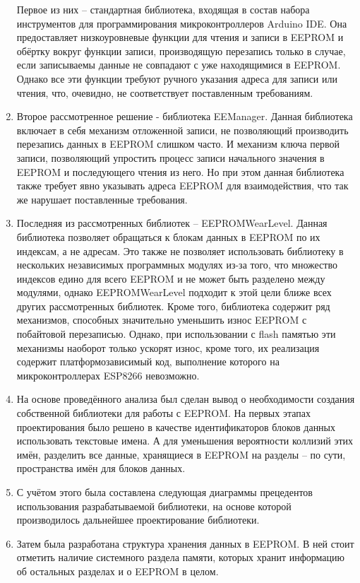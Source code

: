 \documentclass[14pt]{extarticle}
\begin{document}
\begin{enumerate}
	Первое из них -- стандартная библиотека, входящая в состав набора инструментов для программирования микроконтроллеров Arduino IDE.
	Она предоставляет низкоуровневые функции для чтения и записи в EEPROM и обёртку вокруг функции записи, производящую перезапись только в случае, если записываемы данные не совпадают с уже находящимися в EEPROM.
	Однако все эти функции требуют ручного указания адреса для записи или чтения, что, очевидно, не соответствует поставленным требованиям.
	\item Второе рассмотренное решение - библиотека EEManager.
	Данная библиотека включает в себя механизм отложенной записи, не позволяющий производить перезапись данных в EEPROM слишком часто.
	И механизм ключа первой записи, позволяющий упростить процесс записи начального значения в EEPROM и последующего чтения из него.
	Но при этом данная библиотека также требует явно указывать адреса EEPROM для взаимодействия, что так же нарушает поставленные требования.
	\item Последняя из рассмотренных библиотек -- EEPROMWearLevel.
	Данная библиотека позволяет обращаться к блокам данных в EEPROM по их индексам, а не адресам.
	Это также не позволяет использовать библиотеку в нескольких независимых программных модулях из-за того, что множество индексов едино для всего EEPROM и не может быть разделено между модулями, однако EEPROMWearLevel подходит к этой цели ближе всех других рассмотренных библиотек.
	Кроме того, библиотека содержит ряд механизмов, способных значительно уменьшить износ EEPROM с побайтовой перезаписью.
	Однако, при использовании с flash памятью эти механизмы наоборот только ускорят износ, кроме того, их реализация содержит платформозависимый код, выполнение которого на микроконтроллерах ESP8266 невозможно.
	\item На основе проведённого анализа был сделан вывод о необходимости создания собственной библиотеки для работы с EEPROM. На первых этапах проектирования было решено в качестве идентификаторов блоков данных использовать текстовые имена.
	А для уменьшения вероятности коллизий этих имён, разделить все данные, хранящиеся в EEPROM на разделы -- по сути, пространства имён для блоков данных.
	\item С учётом этого была составлена следующая диаграммы прецедентов использования разрабатываемой библиотеки, на основе которой производилось дальнейшее проектирование библиотеки.
	\item Затем была разработана структура хранения данных в EEPROM.
	В ней стоит отметить наличие системного раздела памяти, которых хранит информацию об остальных разделах и о EEPROM в целом.

\end{enumerate}
\end{document}
